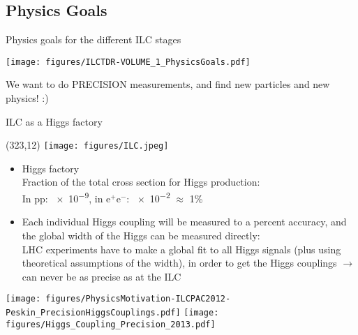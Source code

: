 \documentclass[xcolor={dvipsnames}]{beamer}
\newcommand{\ilclogo}{
  \setlength{\TPHorizModule}{1pt}
  \setlength{\TPVertModule}{1pt}
  \begin{textblock}{1}(323,12)
   \texttt{[image: figures/ILC.jpeg]}
  \end{textblock}
}
\begin{document}
\subsection{Physics Goals}
\begin{frame}{Physics goals for the different ILC stages}
\begin{center}
  \texttt{[image: figures/ILCTDR-VOLUME\_1\_PhysicsGoals.pdf]}
\end{center}
We want to do PRECISION measurements, and find new particles and new physics! :)
\end{frame}
\begin{frame}{ILC as a Higgs factory}
\ilclogo
\begin{itemize}
\item Higgs factory\\
Fraction of the total cross section for Higgs production:\\
In pp: \num{e-9}, in e$^+$e$^-$: \num{e-2} $\approx$ 1\%
\item Each individual Higgs coupling will be measured to a percent accuracy, and the global width of the Higgs can be measured directly:\\LHC experiments have to make a global fit to all Higgs signals (plus using theoretical assumptions of the width), in order to get the Higgs couplings $ \rightarrow$ can never be as precise as at the ILC
\end{itemize}
\hspace*{0.4cm}
 \texttt{[image: figures/PhysicsMotivation-ILCPAC2012-Peskin\_PrecisionHiggsCouplings.pdf]}
 \hspace*{0.2cm}
 \texttt{[image: figures/Higgs\_Coupling\_Precision\_2013.pdf]}
\end{frame}

\end{document}
